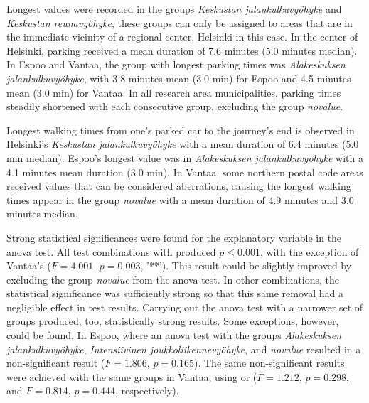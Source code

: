 Longest  values were recorded in the groups \textit{Keskustan jalankulkuvyöhyke} and \textit{Keskustan reunavyöhyke}, these groups can only be assigned to areas that are in the immediate vicinity of a regional center, Helsinki in this case. In the center of Helsinki, parking received a mean duration of 7.6 minutes (5.0 minutes median). In Espoo and Vantaa, the group with longest parking times was \textit{Alakeskuksen jalankulkuvyöhyke}, with 3.8 minutes mean (3.0 min) for Espoo and 4.5 minutes mean (3.0 min) for Vantaa. In all research area municipalities, parking times steadily shortened with each consecutive group, excluding the group \textit{novalue}.

Longest walking times from one's parked car to the journey's end is observed in Helsinki's \textit{Keskustan jalankulkuvyöhyke} with a mean duration of 6.4 minutes (5.0 min median). Espoo's longest  value was in \textit{Alakeskuksen jalankulkuvyöhyke} with a 4.1 minutes mean duration (3.0 min). In Vantaa, some northern postal code areas received  values that can be considered aberrations, causing the longest walking times appear in the group \textit{novalue} with a mean duration of 4.9 minutes and 3.0 minutes median.

Strong statistical significances were found for the explanatory variable  in the \acrshort{anova} test. All test combinations with  produced $p \leq 0.001$, with the exception of Vantaa's  ($F = 4.001$, $p = 0.003$, '**'). This result could be slightly improved by excluding the group \textit{novalue} from the \acrshort{anova} test. In other combinations, the statistical significance was sufficiently strong so that this same removal had a negligible effect in test results. Carrying out the \acrshort{anova} test with a narrower set of groups produced, too, statistically strong results. Some exceptions, however, could be found. In Espoo, where an \acrshort{anova} test with the groups \textit{Alakeskuksen jalankulkuvyöhyke}, \textit{Intensiivinen joukkoliikennevyöhyke}, and \textit{novalue} resulted in a non-significant result ($F = 1.806$, $p = 0.165$). The same non-significant results were achieved with the same groups in Vantaa, using  or  ($F = 1.212$, $p = 0.298$, and $F = 	0.814$, $p = 0.444$, respectively).


